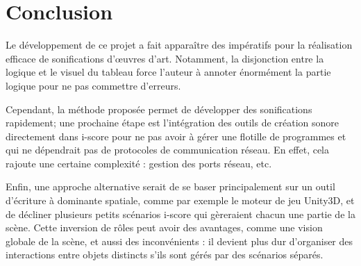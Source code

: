 \documentclass[french]{article}
\begin{document}
    \newpage
    \section*{Conclusion}
    Le développement de ce projet a fait apparaître des impératifs pour la réalisation efficace de sonifications d'\oe uvres d'art. 
    Notamment, la disjonction entre la logique et le visuel du tableau force l'auteur à annoter énormément la partie logique pour ne pas commettre d'erreurs.
    
    Cependant, la méthode proposée permet de développer des sonifications rapidement; une prochaine étape est l'intégration des outils de création sonore directement dans i-score pour ne pas avoir à gérer une flotille de programmes et qui ne dépendrait pas de protocoles de communication réseau. En effet, cela rajoute une certaine complexité : gestion des ports réseau, etc.
    
    Enfin, une approche alternative serait de se baser principalement sur un outil d'écriture à dominante spatiale, comme par exemple le moteur de jeu Unity3D, et de décliner plusieurs petits scénarios i-score qui gèreraient chacun une partie de la scène. 
    Cette inversion de rôles peut avoir des avantages, comme une vision globale de la scène, et aussi des inconvénients : il devient plus dur d'organiser des interactions entre objets distincts s'ils sont gérés par des scénarios séparés.
    
\end{document}
